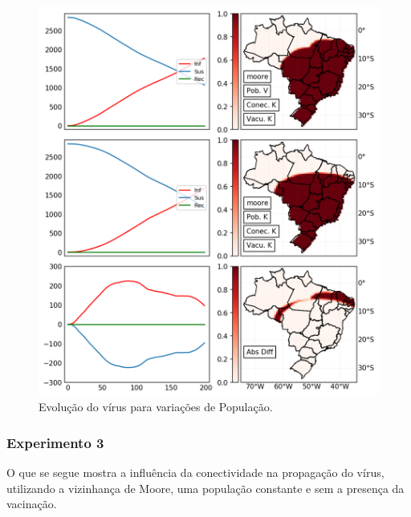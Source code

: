 \documentclass[a4paper,12pt]{article}
\begin{document}
\begin{figure}[!ht]
 \begin{center}
  \includegraphics[width=1\linewidth]{fig/Poblacion.png}
 \end{center}
 \caption{Evolução do vírus para variações de População.}
\label{figure:populacao}
\end{figure}

\newpage
\subsubsection{Experimento 3}
O que se segue mostra a influência da conectividade na propagação do vírus, utilizando a vizinhança de Moore, uma população constante e sem a presença da vacinação.
\end{document}
